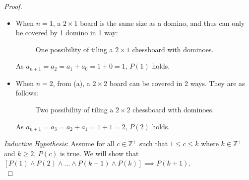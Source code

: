 \documentclass[11pt]{scrartcl}
\theoremstyle{dotlessP}
\theoremstyle{dotlessN}
\newcommand{\ints}{\mathbb{Z}}
\begin{document}
\begin{enumerate}[(a)]
\begin{proof}
		\begin{itemize}
\item			
		When $n=1$, a $2 \times 1$ board is the same size as a domino, and thus can only be covered by 1 domino in 1 way:
		\begin{figure}[H]
		\centering
	\caption{One possibility of tiling a $2 \times 1$ chessboard with dominoes.}
\end{figure}
As $a_{n+1} = a_2 = a_1 + a_0 = 1 + 0 = 1$, $P(1)$ holds.
\item When $n=2$, from (a), a $2\times 2$ board can be covered in 2 ways. They are as follows:
		\begin{figure}[H]
		\centering
	 \quad
	\caption{Two possibility of tiling a $2 \times 2$ chessboard with dominoes.}
\end{figure}
As $a_{n+1} = a_3 = a_2 + a_1 = 1 + 1 = 2$, $P(2)$ holds.
		\end{itemize}

		\textit{Inductive Hypothesis}: Assume for all $c \in \ints^+$ such that $1 \leq c \leq k$ where $k \in \ints^+$ and $k \geq 2$, $P(c)$ is true. We will show that $[P(1) \land P(2) \land \dots \land P(k-1) \land P(k)]\implies P(k+1)$.
	\\


\end{proof}
\end{enumerate}
\end{document}
